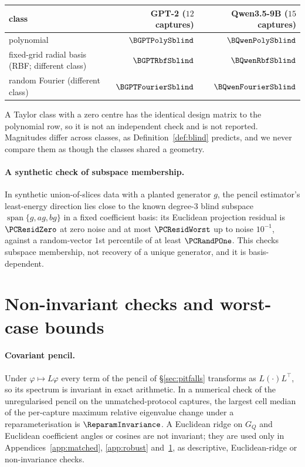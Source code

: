 \begin{center}\small
\begin{tabular}{lrr}
\toprule
class & GPT-2 ($12$ captures) & Qwen3.5-9B ($15$ captures) \\
\midrule
polynomial & $\BGPTPolySblind$ & $\BQwenPolySblind$ \\
fixed-grid radial basis (RBF; different class) & $\BGPTRbfSblind$ & $\BQwenRbfSblind$ \\
random Fourier (different class) & $\BGPTFourierSblind$ & $\BQwenFourierSblind$ \\
\bottomrule
\end{tabular}
\end{center}

\noindent A Taylor class with a zero centre has the identical design matrix to the polynomial row, so it is not an
independent check and is not reported. Magnitudes differ across classes, as Definition~\ref{def:blind} predicts, and
we never compare them as though the classes shared a geometry.

\paragraph{A synthetic check of subspace membership.} In synthetic union-of-slices data with a planted generator $g$,
the pencil estimator's least-energy direction lies close to the known degree-3 blind subspace
$\operatorname{span}\{g,ag,bg\}$ in a fixed coefficient basis: its Euclidean projection residual is $\PCResidZero$ at zero noise and at most
$\PCResidWorst$ up to noise $10^{-1}$, against a random-vector $1$st percentile of at least $\PCRandPOne$. This checks
subspace membership, not recovery of a unique generator, and it is basis-dependent.

\section{Non-invariant checks and worst-case bounds}
\label{app:noninvariant}

\paragraph{Covariant pencil.} Under $\varphi\mapsto L\varphi$ every term of the pencil of \S\ref{sec:pitfalls} transforms as
$L(\cdot)L^\top$, so its spectrum is invariant in exact arithmetic. In a numerical check of the unregularised pencil on
the unmatched-protocol captures, the largest cell median of the per-capture maximum relative eigenvalue change under a
reparameterisation is $\ReparamInvariance$. A Euclidean ridge on $G_Q$ and Euclidean coefficient angles or cosines are
not invariant; they are used only in Appendices~\ref{app:matched}, \ref{app:robust} and~\ref{app:noninvariant}, as
descriptive, Euclidean-ridge or non-invariance checks.

